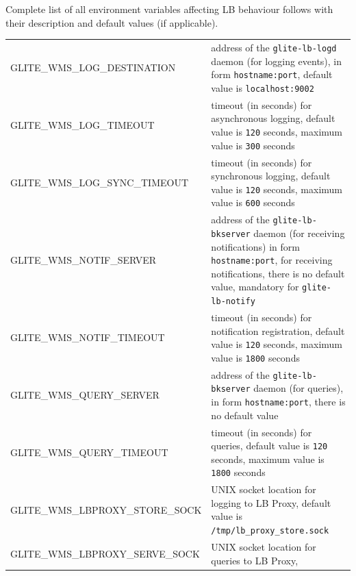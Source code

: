 Complete list of all environment variables affecting LB behaviour follows with 
their description and default values (if applicable).


\begin{tabularx}{\textwidth}{l>{\raggedright\arraybackslash}X}
GLITE\_WMS\_LOG\_DESTINATION & 
   address of the \texttt{glite-lb-logd} daemon (for logging events), 
   in form \texttt{hostname:port},
   default value is \texttt{localhost:9002}\\
GLITE\_WMS\_LOG\_TIMEOUT & 
   timeout (in seconds) for asynchronous logging, 
   default value is \texttt{120} seconds, 
   maximum value is \texttt{300} seconds \\
GLITE\_WMS\_LOG\_SYNC\_TIMEOUT & 
   timeout (in seconds) for synchronous logging, 
   default value is \texttt{120} seconds, 
   maximum value is \texttt{600} seconds \\
GLITE\_WMS\_NOTIF\_SERVER & 
   address of the \texttt{glite-lb-bkserver} daemon (for receiving notifications)
   in form \texttt{hostname:port}, for receiving notifications,
   there is no default value,
   mandatory for \texttt{glite-lb-notify} \\
GLITE\_WMS\_NOTIF\_TIMEOUT & 
   timeout (in seconds) for notification registration,
   default value is \texttt{120} seconds,
   maximum value is \texttt{1800} seconds \\
GLITE\_WMS\_QUERY\_SERVER & 
   address of the \texttt{glite-lb-bkserver} daemon (for queries), 
   in form \texttt{hostname:port}, 
   there is no default value \\
GLITE\_WMS\_QUERY\_TIMEOUT &
   timeout (in seconds) for queries,
   default value is \texttt{120} seconds,
   maximum value is \texttt{1800} seconds \\
GLITE\_WMS\_LBPROXY\_STORE\_SOCK &
   UNIX socket location for logging to LB Proxy,
   default value is \texttt{/tmp/lb\_proxy\_store.sock} \\
GLITE\_WMS\_LBPROXY\_SERVE\_SOCK &
   UNIX socket location for queries to LB Proxy,

\end{tabularx}
